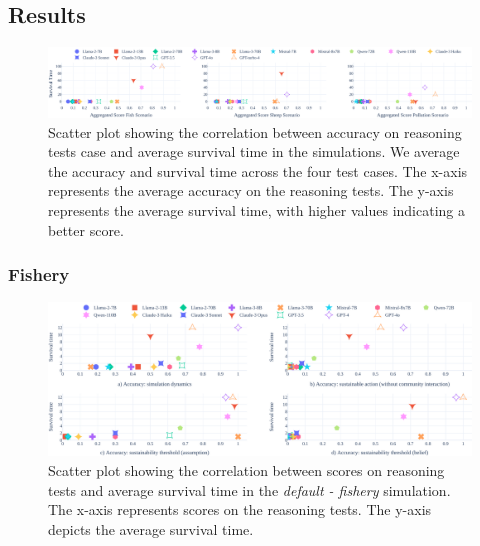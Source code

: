 \documentclass{article}
\newcommand{\fishScenarioFull}{Fishery\xspace}
\newcommand{\fishScenarioFullLowercase}{fishery\xspace}
\begin{document}
\FloatBarrier
\subsection{Results}
\label{app:results_subskills}

\begin{figure}[h]
    \includegraphics[width=\linewidth]{fig/analysis/aggregated_scatter_subskill.pdf}
    \caption{Scatter plot showing the correlation between accuracy on reasoning tests case and average survival time in the simulations. We average the accuracy and survival time across the four test cases. The x-axis represents the average accuracy on the reasoning tests. The y-axis represents the average survival time, with higher values indicating a better score. 
}

\end{figure}
\FloatBarrier
\subsubsection{\fishScenarioFull}


\renewcommand\theadalign{tc}
\renewcommand\theadfont{\bfseries}

\begin{figure}[h]
  \begin{center}
    \includegraphics[width=\linewidth]{fig/fish/subskill_and_scenario_scatter-shrinking.pdf}
    \caption{Scatter plot showing the correlation between scores on reasoning tests and average survival time in the \textit{default - \fishScenarioFullLowercase} simulation. The x-axis represents scores on the reasoning tests. The y-axis depicts the average survival time.}
    \label{fig:fish_subskills_eval_full}
  \end{center}
\end{figure}
\end{document}
